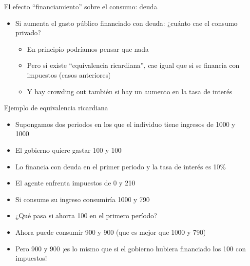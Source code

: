 \documentclass{beamer}
\begin{document}
\begin{frame}{El efecto “financiamiento” sobre el consumo: deuda }
    
    \begin{itemize}
        \item Si aumenta el gasto público financiado con deuda: ¿cuánto cae el consumo privado?
        \begin{itemize}
            \item En principio podríamos pensar que nada 
            \item Pero si existe “equivalencia ricardiana”, cae igual que si se financia con impuestos (casos anteriores)
            \item Y hay crowding out también si hay un aumento en la tasa de interés 
        \end{itemize}
    \end{itemize}

\end{frame}

\begin{frame}{Ejemplo de equivalencia ricardiana}
    
\begin{itemize}
    \item Supongamos dos periodos en los que el individuo tiene ingresos de 1000 y 1000
    \item El gobierno quiere gastar 100 y 100 
    \item Lo financia con deuda en el primer periodo y la tasa de interés es 10\%
    \item El agente enfrenta impuestos de 0 y 210
    \item Si consume su ingreso consumiría 1000 y 790 
    \item ¿Qué pasa si ahorra 100 en el primero período?
    \item Ahora puede consumir 900 y 900 (que es mejor que 1000 y 790)
    \item Pero 900 y 900 ¡es lo mismo que si el gobierno hubiera financiado los 100 con impuestos! 
\end{itemize}

\end{frame}

\end{document}
